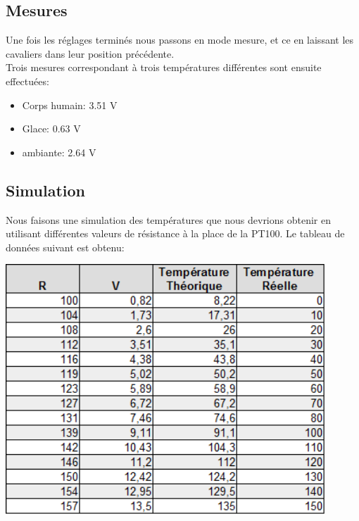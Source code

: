 \documentclass[a4paper,12pt]{article}
\begin{document}
    \subsection{Mesures}
      \par Une fois les réglages terminés nous passons en mode mesure, et ce en laissant les cavaliers dans leur position précédente.\\
      Trois mesures correspondant à trois températures différentes sont ensuite effectuées:
      \begin{itemize}
        \item Corps humain: 3.51 V
        \item Glace: 0.63 V
        \item ambiante: 2.64 V
      \end{itemize}

    \subsection{Simulation}
      \par Nous faisons une simulation des températures que nous devrions obtenir en utilisant différentes valeurs de résistance à la place de la PT100.
			Le tableau de données suivant est obtenu:
			\begin{center}
				\includegraphics[width=12cm]{../Images/TabPT100.png}
			\end{center}
\end{document}
